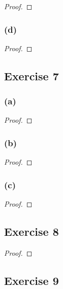 \documentclass[14pt]{extarticle}
\begin{document}
\begin{proof}

\end{proof}

\subsubsection{(d)}

\begin{proof}

\end{proof}

\subsection{Exercise 7}

\subsubsection{(a)}

\begin{proof}

\end{proof}

\subsubsection{(b)}

\begin{proof}

\end{proof}

\subsubsection{(c)}

\begin{proof}

\end{proof}

\subsection{Exercise 8}

\begin{proof}

\end{proof}

\subsection{Exercise 9}
\end{document}

